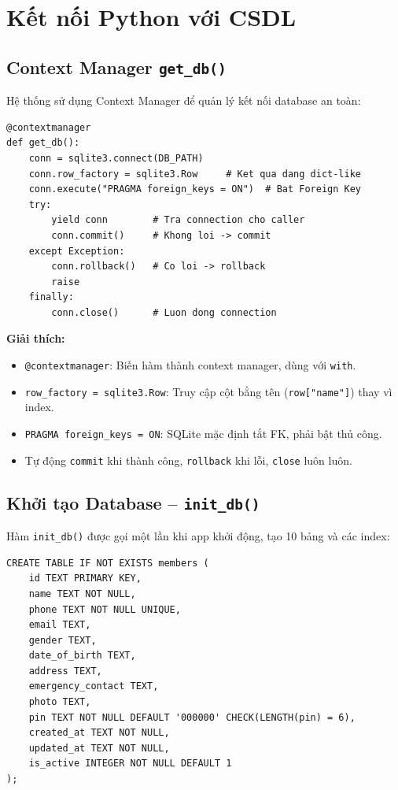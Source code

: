\documentclass[12pt,a4paper]{article}
\begin{document}
\section{Kết nối Python với CSDL}

\subsection{Context Manager \texttt{get\_db()}}

Hệ thống sử dụng Context Manager để quản lý kết nối database an toàn:

\begin{lstlisting}[style=pythonstyle, caption={Context Manager kết nối database}]
@contextmanager
def get_db():
    conn = sqlite3.connect(DB_PATH)
    conn.row_factory = sqlite3.Row     # Ket qua dang dict-like
    conn.execute("PRAGMA foreign_keys = ON")  # Bat Foreign Key
    try:
        yield conn        # Tra connection cho caller
        conn.commit()     # Khong loi -> commit
    except Exception:
        conn.rollback()   # Co loi -> rollback
        raise
    finally:
        conn.close()      # Luon dong connection
\end{lstlisting}

\textbf{Giải thích:}
\begin{itemize}[leftmargin=2cm]
	\item \texttt{@contextmanager}: Biến hàm thành context manager, dùng với \texttt{with}.
	\item \texttt{row\_factory = sqlite3.Row}: Truy cập cột bằng tên (\texttt{row["name"]}) thay vì index.
	\item \texttt{PRAGMA foreign\_keys = ON}: SQLite mặc định tắt FK, phải bật thủ công.
	\item Tự động \texttt{commit} khi thành công, \texttt{rollback} khi lỗi, \texttt{close} luôn luôn.
\end{itemize}

\subsection{Khởi tạo Database -- \texttt{init\_db()}}

Hàm \texttt{init\_db()} được gọi một lần khi app khởi động, tạo 10 bảng và các index:

\begin{lstlisting}[style=sqlstyle, caption={Tạo bảng members}]
CREATE TABLE IF NOT EXISTS members (
    id TEXT PRIMARY KEY,
    name TEXT NOT NULL,
    phone TEXT NOT NULL UNIQUE,
    email TEXT,
    gender TEXT,
    date_of_birth TEXT,
    address TEXT,
    emergency_contact TEXT,
    photo TEXT,
    pin TEXT NOT NULL DEFAULT '000000' CHECK(LENGTH(pin) = 6),
    created_at TEXT NOT NULL,
    updated_at TEXT NOT NULL,
    is_active INTEGER NOT NULL DEFAULT 1
);
\end{lstlisting}
\end{document}
